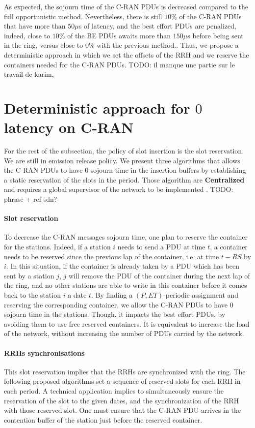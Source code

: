 \documentclass[]{algotel}
\newcommand{\todo}[1]{{\color{red} TODO: {#1}}}
\begin{document}
  As expected, the sojourn time of the C-RAN PDUs is decreased compared to the full opportunistic method. Nevertheless, there is still $10\%$ of the C-RAN PDUs that have more than $50 \mu$s of latency, and the best effort PDUs are penalized, indeed, close to $10\%$ of the BE PDUs awaits more than $150\mu$s before being sent in the ring, versus close to $0\%$ with the previous method..
  Thus, we propose a deterministic approach in which we set the offsets of the RRH and we reserve the containers needed for the C-RAN PDUs.
   \todo{il manque une partie sur le travail de karim, }
  \section{Deterministic approach for $0$ latency on C-RAN}
\label{sec:deterministicalgorithms}

 For the rest of the subsection, the policy of slot insertion is the slot reservation. We are still in emission release policy. We present three algorithms that allows the C-RAN PDUs to have $0$ sojourn time in the insertion buffers by establishing a static reservation of the slots in the period.
 Those algorithm are {\bf Centralized} and requires a global supervisor of the network to be implemented .\todo{phrase + ref sdn?}
 
\paragraph{Slot reservation} To decrease the C-RAN messages sojourn time, one plan to reserve the container for the stations. Indeed, if a station $i$ needs to send a PDU at time $t$, a container needs to be reserved since the previous lap of the container, i.e. at time $t - RS$ by $i$. In this situation, if the container is already taken by a PDU which has been sent by a station $j$, $j$ will remove the PDU of the container during the next lap of the ring, and no other stations are able to write in this container before it comes back to the station $i$ a date $t$. By finding a $(P,ET)$-periodic assignment and reserving the corresponding container, we allow the C-RAN PDUs to have $0$ sojourn time in the stations. Though, it impacts the best effort PDUs, by avoiding them to use free reserved containers. It is equivalent to increase the load of the network, without increasing the number of PDUs carried by the network. 

\paragraph{RRHs synchronisations}
This slot reservation implies that the RRHs are synchronized with the ring. The following proposed algorithms set a sequence of reserved slots for each RRH in each period. A technical application implies to simultaneously ensure the reservation of the slot to the given dates, and the synchronization of the RRH with those reserved slot. One must ensure that the C-RAN PDU arrives in the contention buffer of the station just before the reserved container.
\end{document}
